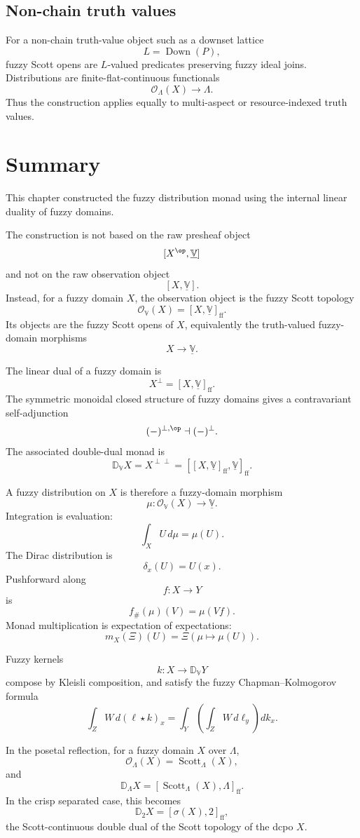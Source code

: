 \subsection{Non-chain truth values}
\label{subsec:non-chain-distribution-example}

For a non-chain truth-value object such as a downset lattice
\[
    L=\operatorname{Down}(P),
\]
fuzzy Scott opens are \(L\)-valued predicates preserving fuzzy ideal joins.
Distributions are finite-flat-continuous functionals
\[
    \mathcal O_{\Lambda}(X)\to\Lambda.
\]
Thus the construction applies equally to multi-aspect or resource-indexed
truth values.

\section{Summary}
\label{sec:summary-fuzzy-distributions}

This chapter constructed the fuzzy distribution monad using the internal
linear duality of fuzzy domains.

The construction is not based on the raw presheaf object
\[
    [X^{\op},\underline{\mathbb V}]
\]
and not on the raw observation object
\[
    [X,\underline{\mathbb V}].
\]
Instead, for a fuzzy domain \(X\), the observation object is the fuzzy Scott
topology
\[
    \mathcal O_{\mathbb V}(X)
    =
    [X,\underline{\mathbb V}]_{\mathrm{ff}}.
\]
Its objects are the fuzzy Scott opens of \(X\), equivalently the truth-valued
fuzzy-domain morphisms
\[
    X\to\underline{\mathbb V}.
\]

The linear dual of a fuzzy domain is
\[
    X^{\perp}
    =
    [X,\underline{\mathbb V}]_{\mathrm{ff}}.
\]
The symmetric monoidal closed structure of fuzzy domains gives a contravariant
self-adjunction
\[
    (-)^{\perp,\op}
    \dashv
    (-)^{\perp}.
\]
The associated double-dual monad is
\[
    \mathbb D_{\mathbb V}X
    =
    X^{\perp\perp}
    =
    [[X,\underline{\mathbb V}]_{\mathrm{ff}},
      \underline{\mathbb V}]_{\mathrm{ff}}.
\]

A fuzzy distribution on \(X\) is therefore a fuzzy-domain morphism
\[
    \mu:\mathcal O_{\mathbb V}(X)\to\underline{\mathbb V}.
\]
Integration is evaluation:
\[
    \int_X U\,d\mu=\mu(U).
\]
The Dirac distribution is
\[
    \delta_x(U)=U(x).
\]
Pushforward along
\[
    f:X\to Y
\]
is
\[
    f_{\#}(\mu)(V)=\mu(Vf).
\]
Monad multiplication is expectation of expectations:
\[
    m_X(\Xi)(U)
    =
    \Xi(\mu\mapsto\mu(U)).
\]

Fuzzy kernels
\[
    k:X\to\mathbb D_{\mathbb V}Y
\]
compose by Kleisli composition, and satisfy the fuzzy
Chapman--Kolmogorov formula
\[
    \int_Z W\,d(\ell\star k)_x
    =
    \int_Y
    \left(
        \int_Z W\,d\ell_y
    \right)
    dk_x.
\]

In the posetal reflection, for a fuzzy domain \(X\) over \(\Lambda\),
\[
    \mathcal O_{\Lambda}(X)
    =
    \operatorname{Scott}_{\Lambda}(X),
\]
and
\[
    \mathbb D_{\Lambda}X
    =
    [\operatorname{Scott}_{\Lambda}(X),\Lambda]_{\mathrm{ff}}.
\]
In the crisp separated case, this becomes
\[
    \mathbb D_2X
    =
    [\sigma(X),2]_{\mathrm{ff}},
\]
the Scott-continuous double dual of the Scott topology of the dcpo \(X\).